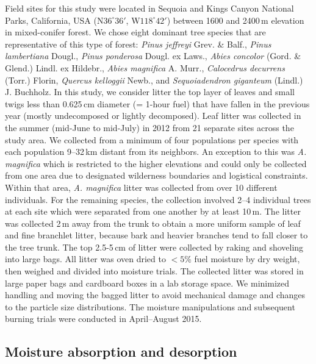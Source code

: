 \documentclass[letterpaper,12pt]{article}
\begin{document}
Field sites for this study were located in Sequoia and Kings Canyon National
Parks, California, USA (N$36^\circ 36'$, W$118^\circ 42'$) between 1600 and
2400\,m elevation in mixed-conifer forest. We chose eight dominant tree species
that are representative of this type of forest: \emph{Pinus jeffreyi} Grev. \&
Balf., \emph{Pinus lambertiana} Dougl., \emph{Pinus ponderosa} Dougl. ex Laws.,
\emph{Abies concolor} (Gord. \& Glend.) Lindl. ex Hildebr., \emph{Abies
  magnifica} A. Murr., \emph{Calocedrus decurrens} (Torr.) Florin,
\emph{Quercus kelloggii} Newb., and \emph{Sequoiadendron giganteum} (Lindl.) J.
Buchholz. In this study, we consider litter the top layer of leaves and small
twigs less than 0.625\,cm diameter (= 1-hour fuel) that have fallen in the
previous year (mostly undecomposed or lightly decomposed). Leaf litter was
collected in the summer (mid-June to mid-July) in 2012 from 21 separate sites
across the study area. We collected from a minimum of four populations per
species with each population 9--32\,km distant from its neighbors. An exception
to this was \emph{A. magnifica} which is restricted to the higher elevations
and could only be collected from one area due to designated wilderness
boundaries and logistical constraints. Within that area, \emph{A. magnifica}
litter was collected from over 10 different individuals. For the remaining
species, the collection involved 2--4 individual trees at each site which were
separated from one another by at least 10\,m. The litter was collected 2\,m
away from the trunk to obtain a more uniform sample of leaf and fine branchlet
litter, because bark and heavier branches tend to fall closer to the tree
trunk. The top 2.5-5\,cm of litter were collected by raking and shoveling into
large bags. All litter was oven dried to $< 5$\% fuel moisture by dry weight,
then weighed and divided into moisture trials. The collected litter was stored
in large paper bags and cardboard boxes in a lab storage space. We minimized
handling and moving the bagged litter to avoid mechanical damage and changes to
the particle size distributions. The moisture manipulations and subsequent
burning trials were conducted in April--August 2015.

\subsection*{Moisture absorption and desorption}
\end{document}
